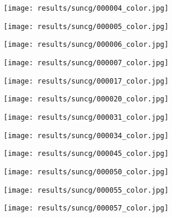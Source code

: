 \begin{figure}[h!]
  \centering
  \begin{subfigure}[b]{0.32\linewidth}
    \texttt{[image: results/suncg/000004\_color.jpg]}
  \end{subfigure}
  \begin{subfigure}[b]{0.32\linewidth}
    \texttt{[image: results/suncg/000005\_color.jpg]}
  \end{subfigure}
  \begin{subfigure}[b]{0.32\linewidth}
    \texttt{[image: results/suncg/000006\_color.jpg]}
  \end{subfigure}
  \begin{subfigure}[b]{0.32\linewidth}
    \texttt{[image: results/suncg/000007\_color.jpg]}
  \end{subfigure}
  \begin{subfigure}[b]{0.32\linewidth}
    \texttt{[image: results/suncg/000017\_color.jpg]}
  \end{subfigure}
  \begin{subfigure}[b]{0.32\linewidth}
    \texttt{[image: results/suncg/000020\_color.jpg]}
  \end{subfigure}
  \begin{subfigure}[b]{0.32\linewidth}
    \texttt{[image: results/suncg/000031\_color.jpg]}
  \end{subfigure}
  \begin{subfigure}[b]{0.32\linewidth}
    \texttt{[image: results/suncg/000034\_color.jpg]}
  \end{subfigure}
  \begin{subfigure}[b]{0.32\linewidth}
    \texttt{[image: results/suncg/000045\_color.jpg]}
  \end{subfigure}
  \begin{subfigure}[b]{0.32\linewidth}
    \texttt{[image: results/suncg/000050\_color.jpg]}
  \end{subfigure}
  \begin{subfigure}[b]{0.32\linewidth}
    \texttt{[image: results/suncg/000055\_color.jpg]}
  \end{subfigure}
  \begin{subfigure}[b]{0.32\linewidth}
    \texttt{[image: results/suncg/000057\_color.jpg]}
  \end{subfigure}
  \begin{subfigure}[b]{0.32\linewidth}

\end{subfigure}
\end{figure}
